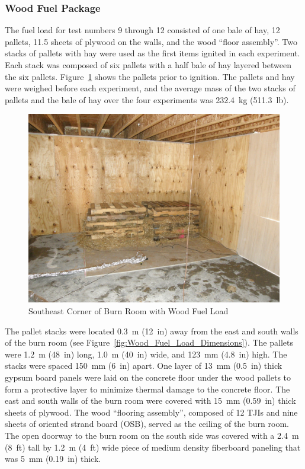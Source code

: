 \documentclass[12pt,oneside]{book}
\begin{document}
\subsubsection{Wood Fuel Package}
\label{sec:fire_suppression_pallet_fuel}

The fuel load for test numbers 9 through 12 consisted of one bale of hay, 12 pallets, 11.5 sheets of plywood on the walls, and the wood ``floor assembly''. Two stacks of pallets with hay were used as the first items ignited in each experiment. Each stack was composed of six pallets with a half bale of hay layered between the six pallets. Figure~\ref{fig:Wood_Fuel_Load} shows the pallets prior to ignition. The pallets and hay were weighed before each experiment, and the average mass of the two stacks of pallets and the bale of hay over the four experiments was 232.4~kg (511.3~lb).

\begin{figure}[!ht]
	\includegraphics[width=0.65\columnwidth]{../Figures/Pictures/Wood_Fuel_Package}
	\caption{Southeast Corner of Burn Room with Wood Fuel Load}
	\label{fig:Wood_Fuel_Load}
\end{figure}

The pallet stacks were located 0.3~m (12~in) away from the east and south walls of the burn room (see Figure~\ref{fig:Wood_Fuel_Load_Dimensions}). The pallets were 1.2~m (48~in) long, 1.0~m (40~in) wide, and 123~mm (4.8~in) high. The stacks were spaced 150~mm (6~in) apart. One layer of 13~mm (0.5~in) thick gypsum board panels were laid on the concrete floor under the wood pallets to form a protective layer to minimize thermal damage to the concrete floor. The east and south walls of the burn room were covered with 15~mm (0.59~in) thick sheets of plywood.  The wood ``flooring assembly'', composed of 12 TJIs and nine sheets of oriented strand board (OSB), served as the ceiling of the burn room. The open doorway to the burn room on the south side was covered with a 2.4~m (8~ft) tall by 1.2~m (4~ft) wide piece of medium density fiberboard paneling that was 5~mm (0.19~in) thick.
\end{document}
